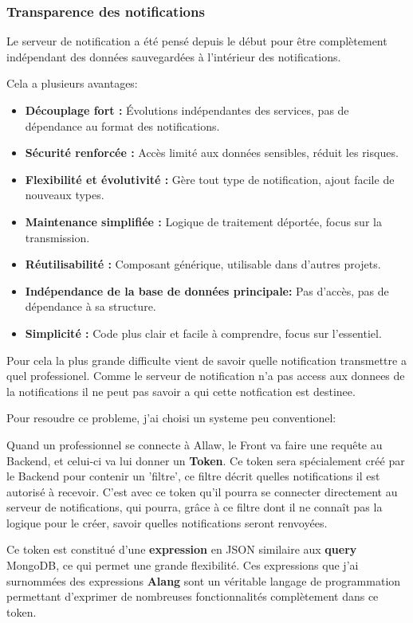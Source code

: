 \subsubsection{Transparence des notifications}

Le serveur de notification a été pensé depuis le début pour être complètement
indépendant des données sauvegardées à l'intérieur des notifications.

Cela a plusieurs avantages:

\begin{itemize}
	\item {\bf Découplage fort :} Évolutions indépendantes des services, pas de dépendance au format des notifications.
	\item {\bf Sécurité renforcée :} Accès limité aux données sensibles, réduit les risques.
	\item {\bf Flexibilité et évolutivité :} Gère tout type de notification, ajout facile de nouveaux types.
	\item {\bf Maintenance simplifiée :} Logique de traitement déportée, focus sur la transmission.
	\item {\bf Réutilisabilité :} Composant générique, utilisable dans d'autres projets.
	\item {\bf Indépendance de la base de données principale:} Pas d'accès, pas de dépendance à sa structure.
	\item {\bf Simplicité :} Code plus clair et facile à comprendre, focus sur l'essentiel.
\end{itemize}

Pour cela la plus grande difficulte vient de savoir quelle notification transmettre
a quel professionel. Comme le serveur de notification n'a pas access aux donnees de la notifications
il ne peut pas savoir a qui cette notfication est destinee.

Pour resoudre ce probleme, j'ai choisi un systeme peu conventionel:

Quand un professionnel se connecte à Allaw, le Front va faire une requête au
Backend, et celui-ci va lui donner un {\bf Token}. Ce token sera spécialement créé
par le Backend pour contenir un 'filtre', ce filtre décrit quelles notifications
il est autorisé à recevoir. C'est avec ce token qu'il pourra se connecter
directement au serveur de notifications, qui pourra, grâce à ce filtre dont il
ne connaît pas la logique pour le créer, savoir quelles notifications seront
renvoyées.

Ce token est constitué d'une {\bf expression} en JSON similaire aux {\bf query}
MongoDB, ce qui permet une grande flexibilité. Ces expressions que j'ai
surnommées des expressions {\bf Alang} sont un véritable langage de programmation
permettant d'exprimer de nombreuses fonctionnalités complètement dans ce token.

